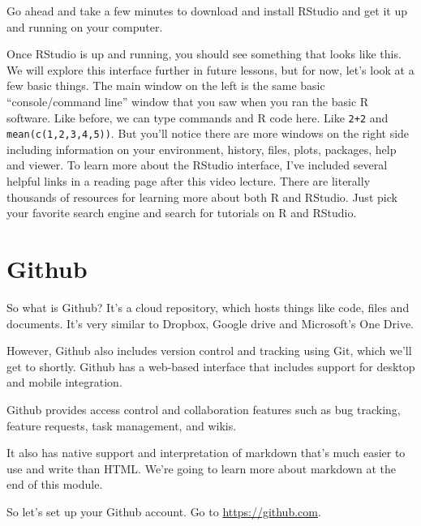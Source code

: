 \documentclass[
]{book}
\begin{document}
Go ahead and take a few minutes to download and install RStudio and get it up and running on your computer.

Once RStudio is up and running, you should see something that looks like this. We will explore this interface further in future lessons, but for now, let's look at a few basic things. The main window on the left is the same basic ``console/command line'' window that you saw when you ran the basic R software. Like before, we can type commands and R code here. Like \texttt{2+2} and \texttt{mean(c(1,2,3,4,5))}. But you'll notice there are more windows on the right side including information on your environment, history, files, plots, packages, help and viewer. To learn more about the RStudio interface, I've included several helpful links in a reading page after this video lecture. There are literally thousands of resources for learning more about both R and RStudio. Just pick your favorite search engine and search for tutorials on R and RStudio.

\hypertarget{github}{%
\section{Github}\label{github}}

So what is Github? It's a cloud repository, which hosts things like code, files and documents. It's very similar to Dropbox, Google drive and Microsoft's One Drive.

However, Github also includes version control and tracking using Git, which we'll get to shortly. Github has a web-based interface that includes support for desktop and mobile integration.

Github provides access control and collaboration features such as bug tracking, feature requests, task management, and wikis.

It also has native support and interpretation of markdown that's much easier to use and write than HTML. We're going to learn more about markdown at the end of this module.

So let's set up your Github account. Go to \url{https://github.com}.
\end{document}
